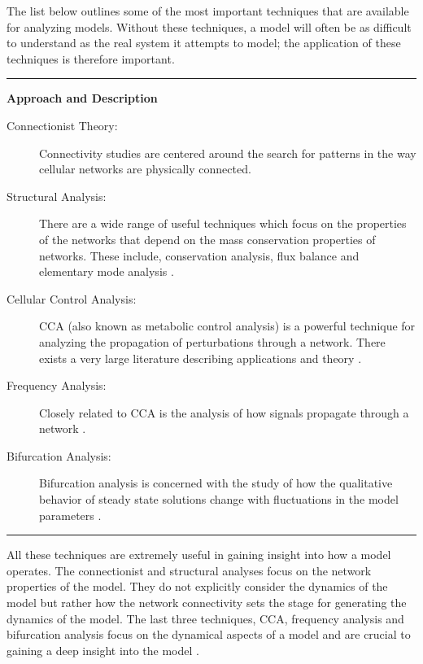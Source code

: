 The list below outlines some of the most important techniques that are
available for analyzing models. Without these techniques, a model will
often be as difficult to understand as the real system it attempts to
model; the application of these techniques is therefore important.

\begin{center}\rule{3in}{0.4pt}\end{center}

\textbf{Approach and Description}

\begin{description}
\item[Connectionist Theory:]
Connectivity studies are centered around the search for patterns in the
way cellular networks are physically connected.
\autocite{BarabasiReview2004}

\item[Structural Analysis:]
There are a wide range of useful techniques which focus on the
properties of the networks that depend on the mass conservation
properties of networks. These include, conservation analysis, flux
balance and elementary mode analysis \autocite{Schuster:Book}.

\item[Cellular Control Analysis:]
CCA (also known as metabolic control analysis) is a powerful technique
for analyzing the propagation of perturbations through a network. There
exists a very large literature describing applications and theory
\autocite{Fell:Book}.

\item[Frequency Analysis:]
Closely related to CCA is the analysis of how signals propagate through
a network \autocites{Ingalls2004}{RaoSauroArkin}.

\item[Bifurcation Analysis:]
Bifurcation analysis is concerned with the study of how the qualitative
behavior of steady state solutions change with fluctuations in the model
parameters \autocite{TysonNatReview2001}.

\end{description}
\begin{center}\rule{3in}{0.4pt}\end{center}

All these techniques are extremely useful in gaining insight into how a
model operates. The connectionist and structural analyses focus on the
network properties of the model. They do not explicitly consider the
dynamics of the model but rather how the network connectivity sets the
stage for generating the dynamics of the model. The last three
techniques, CCA, frequency analysis and bifurcation analysis focus on
the dynamical aspects of a model and are crucial to gaining a deep
insight into the model \autocites{Bakker:1997}{TysonNatReview2001}.

